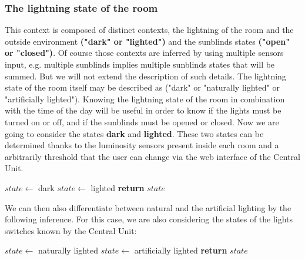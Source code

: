 \documentclass{acm_proc_article-sp}
\begin{document}
\subsubsection*{The lightning state of the room}
 This context is composed of distinct contexts, the lightning of the room and the outside environment \textbf{("dark" or "lighted")} and the sunblinds states \textbf{("open" or "closed")}. 
 Of course those contexts are inferred by using multiple sensors input, e.g. multiple sunblinds implies multiple sunblinds states that will be summed. But we will not extend the description of such details.
 The lightning state of the room itself may be described as ("dark" or "naturally lighted" or "artificially lighted").
 Knowing the lightning state of the room in combination with the time of the day will be useful in order to know if the lights must be turned on or off, and if the sunblinds must be opened or closed. Now we are going to consider the states \textbf{dark} and \textbf{lighted}. These two states can be determined thanks to the luminosity sensors present inside each room and a arbitrarily threshold that the user can change via the web interface of the Central Unit.
 \begin{description}
  \begin{algorithm}
  \begin{algorithmic}
      \State $state\gets$ dark
    \Else
      \State $state\gets$ lighted
  \EndIf
  \State \textbf{return} $state$
  \end{algorithmic}
  \end{algorithm}
\end{description}
We can then also differentiate between natural and the artificial lighting by the following inference. For this case, we are also considering the states of the lights switches known by the Central Unit:
\begin{description}  
  \begin{algorithm}
  \begin{algorithmic}
	\State $state\gets$ naturally lighted
	\State $state\gets$ artificially lighted
      \EndIf
    \EndIf
  \State \textbf{return} $state$
  \end{algorithmic}
  \end{algorithm}
\end{description}
\end{document}
